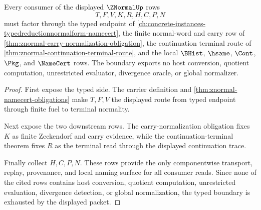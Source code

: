 \begin{theorem}
\label{thm:znormal-typed-boundary-exhaustion}
Every consumer of the displayed $\ZNormalUp$ rows
$$
T,F,V,K,R,H,C,P,N
$$
must factor through the typed endpoint of \autoref{ch:concrete-instances-typedreductionnormalform-namecert}, the finite normal-word and carry row of \autoref{thm:znormal-carry-normalization-obligation}, the continuation terminal route of \autoref{thm:znormal-continuation-terminal-route}, and the local $\BHist$, $\hsame$, $\Cont$, $\Pkg$, and $\NameCert$ rows. The boundary exports no host conversion, quotient computation, unrestricted evaluator, divergence oracle, or global normalizer.
\end{theorem}
\begin{proof}
First expose the typed side. The carrier definition and \autoref{thm:znormal-namecert-obligations} make $T,F,V$ the displayed route from typed endpoint through finite fuel to terminal normality.

Next expose the two downstream rows. The carry-normalization obligation fixes $K$ as finite Zeckendorf and carry evidence, while the continuation-terminal theorem fixes $R$ as the terminal read through the displayed continuation trace.

Finally collect $H,C,P,N$. These rows provide the only componentwise transport, replay, provenance, and local naming surface for all consumer reads. Since none of the cited rows contains host conversion, quotient computation, unrestricted evaluation, divergence detection, or global normalization, the typed boundary is exhausted by the displayed packet.
\end{proof}

